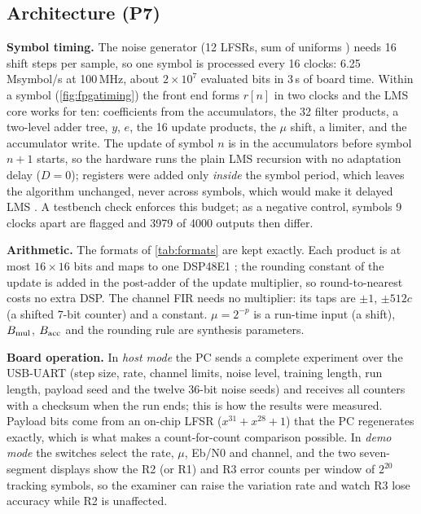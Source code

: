 \subsection{Architecture (P7)}
\label{sec:fpgaarch}
\begin{newtext}
\noindent\textbf{Symbol timing.} The noise generator (12 LFSRs, sum of uniforms \cite{alfke1996,irwin1927,hall1927}) needs 16 shift steps per sample, so one symbol is processed every 16 clocks: 6.25\,Msymbol/s at 100\,MHz, about $2\times10^7$ evaluated bits in 3\,s of board time. Within a symbol (\cref{fig:fpgatiming}) the front end forms $r[n]$ in two clocks and the LMS core works for ten: coefficients from the accumulators, the 32 filter products, a two-level adder tree, $y$, $e$, the 16 update products, the $\mu$ shift, a limiter, and the accumulator write. The update of symbol $n$ is in the accumulators before symbol $n+1$ starts, so the hardware runs the plain LMS recursion with no adaptation delay ($D=0$); registers were added only \emph{inside} the symbol period, which leaves the algorithm unchanged, never across symbols, which would make it delayed LMS \cite{long1989}. A testbench check enforces this budget; as a negative control, symbols 9 clocks apart are flagged and 3979 of 4000 outputs then differ.

\noindent\textbf{Arithmetic.} The formats of \cref{tab:formats} are kept exactly. Each product is at most $16\times16$ bits and maps to one DSP48E1 \cite{xilinxug479}; the rounding constant of the update is added in the post-adder of the update multiplier, so round-to-nearest costs no extra DSP. The channel FIR needs no multiplier: its taps are $\pm1$, $\pm512c$ (a shifted 7-bit counter) and a constant. $\mu=2^{-p}$ is a run-time input (a shift), $B_{\rm mul}$, $B_{\rm acc}$ and the rounding rule are synthesis parameters.

\noindent\textbf{Board operation.} In \emph{host mode} the PC sends a complete experiment over the USB-UART (step size, rate, channel limits, noise level, training length, run length, payload seed and the twelve 36-bit noise seeds) and receives all counters with a checksum when the run ends; this is how the  results were measured. Payload bits come from an on-chip LFSR ($x^{31}+x^{28}+1$) that the PC regenerates exactly, which is what makes a count-for-count comparison possible. In \emph{demo mode} the switches select the rate, $\mu$, Eb/N0 and channel, and the two seven-segment displays show the R2 (or R1) and R3 error counts per window of $2^{20}$ tracking symbols, so the examiner can raise the variation rate and watch R3 lose accuracy while R2 is unaffected.
\end{newtext}

